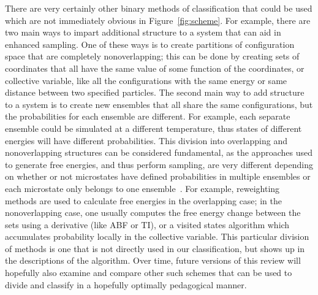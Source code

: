 \documentclass[9pt,review]{livecoms}
\begin{document}
There are very certainly other binary methods of classification that could be used which are not immediately obvious in Figure~\ref{fig:scheme}. For example, there are two main ways to impart additional structure to a system that can aid in enhanced sampling. One of these ways is to create partitions of configuration space that are completely nonoverlapping; this can be done by creating sets of coordinates that all have the same value of some function of the coordinates, or \hypertarget{ref:CV} {collective variable}, like all the configurations with the same energy or same distance between two specified particles. The second main way to add structure to a system is to create new ensembles that all share the same configurations, but the probabilities for each ensemble are different. For example, each separate ensemble could be simulated at a different temperature, thus states of different energies will have different probabilities.
This division into overlapping and nonoverlapping structures can be considered fundamental, as the approaches used to generate free energies, and thus perform  sampling, are very different depending on whether or not microstates have defined probabilities in multiple ensembles or each microstate only belongs to one ensemble~\cite{Escobedo_unified_2005,abreu_framework_2006}. For example, reweighting methods are used to calculate free energies in the overlapping case; in the nonoverlapping case, one usually computes the free energy change between the sets using a derivative (like ABF or TI), or a visited states algorithm which accumulates probability locally in the collective variable. This particular division of methods is one that is not directly used in our classification, but shows up in the descriptions of the algorithm.  Over time, future versions of this review will hopefully also examine and compare other such schemes that can be used to divide and classify in a hopefully optimally pedagogical manner.



\end{document}
